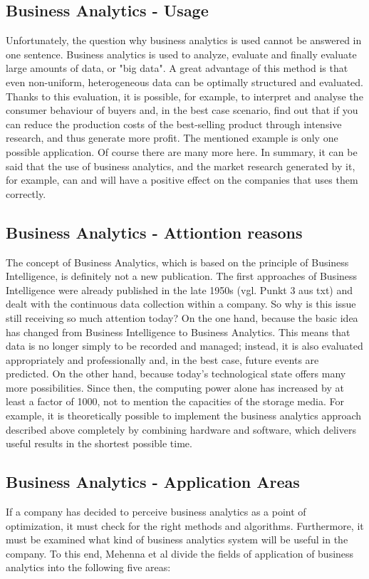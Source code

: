 \documentclass[12pt,twocolumn,twoside]{conference}   %
\begin{document}
\subsection{Business Analytics - Usage}
Unfortunately, the question why business analytics is used cannot be answered in one sentence. Business analytics is used to analyze, evaluate and finally evaluate large amounts of data, or "big data". A great advantage of this method is that even non-uniform, heterogeneous data can be optimally structured and evaluated. Thanks to this evaluation, it is possible, for example, to interpret and analyse the consumer behaviour of buyers and, in the best case scenario, find out that if you can reduce the production costs of the best-selling product through intensive research, and thus generate more profit. The mentioned example is only one possible application. Of course there are many more here. In summary, it can be said that the use of business analytics, and the market research generated by it, for example, can and will have a positive effect on the companies that uses them correctly.

\subsection{Business Analytics - Attiontion reasons}
The concept of Business Analytics, which is based on the principle of Business Intelligence, is definitely not a new publication. The first approaches of Business Intelligence were already published in the late 1950s (vgl. Punkt 3 aus txt) and dealt with the continuous data collection within a company. So why is this issue still receiving so much attention today? On the one hand, because the basic idea has changed from Business Intelligence to Business Analytics. This means that data is no longer simply to be recorded and managed; instead, it is also evaluated appropriately and professionally and, in the best case, future events are predicted.  On the other hand, because today's technological state offers many more possibilities. Since then, the computing power alone has increased by at least a factor of 1000, not to mention the capacities of the storage media.  For example, it is theoretically possible to implement the business analytics approach described above completely by combining hardware and software, which delivers useful results in the shortest possible time.

\subsection{Business Analytics - Application Areas}
If a company has decided to perceive business analytics as a point of optimization, it must check for the right methods and algorithms. Furthermore, it must be examined what kind of business analytics system will be useful in the company. To this end, Mehenna et al divide the fields of application of business analytics into the following five areas:
\end{document}
